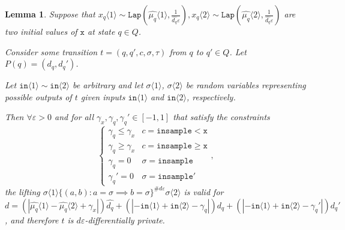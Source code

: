 \documentclass[12pt]{article}
\newcommand{\gguard}[1][x]{\texttt{insample}\geq #1}
\newcommand{\lguard}[1][x]{\texttt{insample} < #1}
\newcommand{\brangle}[1]{\langle #1 \rangle}
\newcommand{\Lap}{\texttt{Lap}}
\newtheorem{lemma}[thm]{Lemma}
\theoremstyle{definition}
\begin{document}
\begin{lemma}\label{indTransitionCoupling}
    Suppose that $x_q\brangle{1}\sim \Lap(\hat{\mu_q}\brangle{1}, \frac{1}{\hat{d_q}\varepsilon}), x_q\brangle{2}\sim\Lap(\hat{\mu_q}\brangle{2}, \frac{1}{\hat{d_q}\varepsilon})$ are two initial values of $\texttt{x}$ at state $q\in Q$. 

    Consider some transition $t = (q, q', c, \sigma, \tau)$ from $q$ to $q'\in Q$. Let $P(q) = (d_q, d_q')$.

    Let $\texttt{in}\brangle{1}\sim \texttt{in}\brangle{2}$ be arbitrary and let $\sigma\brangle{1}$, $\sigma\brangle{2}$ be random variables representing possible outputs of $t$ given inputs $\texttt{in}\brangle{1}$ and $\texttt{in}\brangle{2}$, respectively. 

    Then $\forall \varepsilon>0$ and for all $\gamma_x, \gamma_q, \gamma_q'\in [-1, 1]$ that satisfy the constraints \[
        \begin{cases}
          \gamma_q\leq\gamma_x & c = \lguard[\texttt{x}]\\
          \gamma_q\geq\gamma_x & c = \gguard[\texttt{x}]\\
          \gamma_q=0 & \sigma = \texttt{insample}\\
          \gamma_q'=0 & \sigma = \texttt{insample}'
        \end{cases},
      \]
      the lifting $\sigma\brangle{1}\{(a, b): a=\sigma\implies b=\sigma\}^{\#d\varepsilon}\sigma\brangle{2}$ is valid for $d = (|\hat{\mu_q}\brangle{1}-\hat{\mu_q}\brangle{2}+\gamma_x|)\hat{d_q}+(|-\texttt{in}\brangle{1}+\texttt{in}\brangle{2}-\gamma_q|)d_q+(|-\texttt{in}\brangle{1}+\texttt{in}\brangle{2}-\gamma_q'|)d_q'$, and therefore $t$ is $d\varepsilon$-differentially private. 
\end{lemma}
\end{document}
